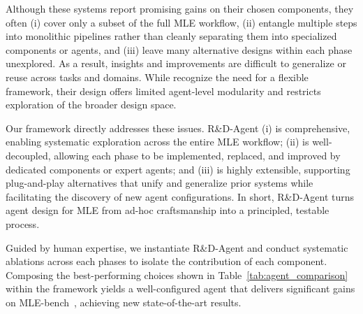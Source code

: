 Although these systems report promising gains on their chosen components, they often (i) cover only a subset of the full MLE workflow, (ii) entangle multiple steps into monolithic pipelines rather than cleanly separating them into specialized components or agents, and (iii) leave many alternative designs within each phase unexplored. As a result, insights and improvements are difficult to generalize or reuse across tasks and domains. While \citet{toledo2025ai} recognize the need for a flexible framework, their design offers limited agent-level modularity and restricts exploration of the broader design space.

Our framework directly addresses these issues. R\&D-Agent (i) is comprehensive, enabling systematic exploration across the entire MLE workflow; (ii) is well-decoupled, allowing each phase to be implemented, replaced, and improved by dedicated components or expert agents; and (iii) is highly extensible, supporting plug-and-play alternatives that unify and generalize prior systems while facilitating the discovery of new agent configurations. In short, R\&D-Agent turns agent design for MLE from ad-hoc craftsmanship into a principled, testable process. 

Guided by human expertise, we instantiate R\&D-Agent and conduct systematic ablations across each phases to isolate the contribution of each component. Composing the best-performing choices shown in Table~\ref{tab:agent_comparison} within the framework yields a well-configured agent that delivers significant gains on MLE-bench~\citep{chan2024mle-bench}, achieving new state-of-the-art results.


